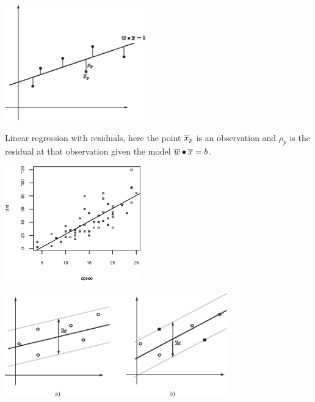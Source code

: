 \documentclass[a4paper,blends,pdf,colorBG,slideColor]{prosper}
\begin{document}
\vspace{.2in}
\begin{center}
\includegraphics[height=50mm]{figures/fig12-01.eps}
\end{center}

Linear regression with residuals, here the point $\overline{x}_p$ is an observation and $\rho_p$
is the residual at that observation given the model $\overline{w}\bullet\overline{x}=b$.
\es


\begin{center}
\includegraphics[height=50mm]{figures/fig12-02.eps}
\end{center}


\es


\begin{center}
\includegraphics[height=45mm]{figures/fig12-03.eps}
\end{center}
\end{document}
